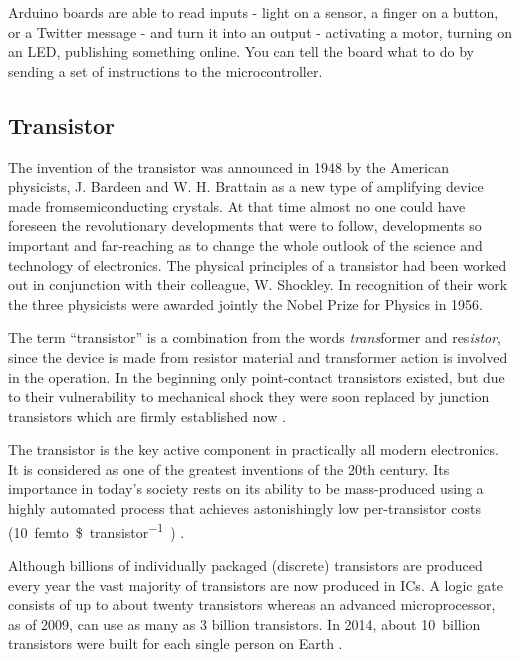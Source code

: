 Arduino boards are able to read inputs - light on a sensor, a finger on a button, or a Twitter message - and turn it into an output - activating a motor, turning on an LED, publishing something online. You can tell the board what to do by sending a set of instructions to the microcontroller.

\subsection{Transistor}

The invention of the transistor was announced in 1948 by the American physicists, J. Bardeen and W. H. Brattain as a new type of amplifying device made fromsemiconducting crystals. At that time almost no one could have foreseen the revolutionary developments that were to follow, developments so important and far-reaching as to change the whole outlook of the science and technology of electronics. The physical principles of a transistor had been worked out in conjunction with their colleague, W. Shockley. In recognition of their work the three physicists were awarded jointly the Nobel Prize for Physics in 1956.\par


The term ``transistor'' is a combination from the words \textit{trans}former and res\textit{istor}, since the device is made from resistor material and transformer action is involved in the operation. In the beginning only point-contact transistors existed, but due to their vulnerability to mechanical shock they were soon replaced by junction transistors which are firmly established now \cite{olsen}.\par

The transistor is the key active component in practically all modern electronics. It is considered as one of the greatest inventions of the 20th century. Its importance in today's society rests on its ability to be mass-produced using a highly automated process that achieves astonishingly low per-transistor costs (\SI{10}{femto\$\per transistor)} \cite{trans:1}.\par

Although billions of individually packaged (discrete) transistors are produced every year the vast majority of transistors are now produced in \acp{IC}. A logic gate consists of up to about twenty transistors whereas an advanced microprocessor, as of 2009, can use as many as 3 billion transistors. In 2014, about \SI{10}{billion} transistors were built for each single person on Earth \cite{trans:1}.


